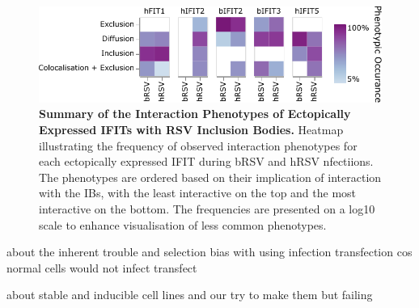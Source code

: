 \begin{figure}
    \centering
    \includegraphics[width=1\linewidth]{09. Chapter 4/Figs/heatmap-infection-transfection.pdf}
    \caption[Summary of the Interaction Phenotypes of Ectopically Expressed IFITs with RSV Inclusion Bodies.]{\textbf{Summary of the Interaction Phenotypes of Ectopically Expressed IFITs with RSV Inclusion Bodies.} Heatmap illustrating the frequency of observed interaction phenotypes for each ectopically expressed IFIT during bRSV and hRSV nfectiions. The phenotypes are ordered based on their implication of interaction with the IBs, with the least interactive on the top and the most interactive on the bottom. The frequencies are presented on a log10 scale to enhance visualisation of less common phenotypes.}
    \label{fig:Summary of the Interaction Phenotypes of Ectopically Expressed IFITs with RSV Inclusion Bodies}
\end{figure}






about the inherent trouble and selection bias with using infection transfection cos normal cells would not infect transfect

about stable and inducible cell lines and our try to make them but failing